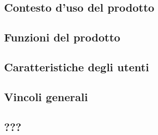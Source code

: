 \subsection{Contesto d'uso del prodotto}
\subsection{Funzioni del prodotto}
\subsection{Caratteristiche degli utenti}
\subsection{Vincoli generali}
\subsection{???}